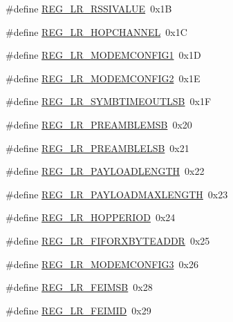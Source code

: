 \begin{DoxyCompactItemize}
\item 
\#define \mbox{\hyperlink{sx1276_regs-_lo_ra_8h_a51636b899dd268fa04ddfa2c66329f05}{R\+E\+G\+\_\+\+L\+R\+\_\+\+R\+S\+S\+I\+V\+A\+L\+UE}}~0x1B
\item 
\#define \mbox{\hyperlink{sx1276_regs-_lo_ra_8h_a5eb22acab75323e171815532117539e4}{R\+E\+G\+\_\+\+L\+R\+\_\+\+H\+O\+P\+C\+H\+A\+N\+N\+EL}}~0x1C
\item 
\#define \mbox{\hyperlink{sx1276_regs-_lo_ra_8h_af759d830088be4284079ba8aa75d98ae}{R\+E\+G\+\_\+\+L\+R\+\_\+\+M\+O\+D\+E\+M\+C\+O\+N\+F\+I\+G1}}~0x1D
\item 
\#define \mbox{\hyperlink{sx1276_regs-_lo_ra_8h_ae96f87f817a89b1240cfdc89f17b6e30}{R\+E\+G\+\_\+\+L\+R\+\_\+\+M\+O\+D\+E\+M\+C\+O\+N\+F\+I\+G2}}~0x1E
\item 
\#define \mbox{\hyperlink{sx1276_regs-_lo_ra_8h_a7759fc860cf446c7e1a92a823a89ea31}{R\+E\+G\+\_\+\+L\+R\+\_\+\+S\+Y\+M\+B\+T\+I\+M\+E\+O\+U\+T\+L\+SB}}~0x1F
\item 
\#define \mbox{\hyperlink{sx1276_regs-_lo_ra_8h_a786457a6b4788117f8a2b994e68344ba}{R\+E\+G\+\_\+\+L\+R\+\_\+\+P\+R\+E\+A\+M\+B\+L\+E\+M\+SB}}~0x20
\item 
\#define \mbox{\hyperlink{sx1276_regs-_lo_ra_8h_a4449a1e2b055269d13034ebb4ba705b2}{R\+E\+G\+\_\+\+L\+R\+\_\+\+P\+R\+E\+A\+M\+B\+L\+E\+L\+SB}}~0x21
\item 
\#define \mbox{\hyperlink{sx1276_regs-_lo_ra_8h_a702e1e9ac301d26eb08fed50b90c6718}{R\+E\+G\+\_\+\+L\+R\+\_\+\+P\+A\+Y\+L\+O\+A\+D\+L\+E\+N\+G\+TH}}~0x22
\item 
\#define \mbox{\hyperlink{sx1276_regs-_lo_ra_8h_ae71e7acfa7c8c737e55349e72c71349f}{R\+E\+G\+\_\+\+L\+R\+\_\+\+P\+A\+Y\+L\+O\+A\+D\+M\+A\+X\+L\+E\+N\+G\+TH}}~0x23
\item 
\#define \mbox{\hyperlink{sx1276_regs-_lo_ra_8h_a829b59cc8b18d86904af96d1dc60add2}{R\+E\+G\+\_\+\+L\+R\+\_\+\+H\+O\+P\+P\+E\+R\+I\+OD}}~0x24
\item 
\#define \mbox{\hyperlink{sx1276_regs-_lo_ra_8h_a71cd184cd1fae95aeb458d8361d51cdd}{R\+E\+G\+\_\+\+L\+R\+\_\+\+F\+I\+F\+O\+R\+X\+B\+Y\+T\+E\+A\+D\+DR}}~0x25
\item 
\#define \mbox{\hyperlink{sx1276_regs-_lo_ra_8h_aecf214e63c69601e543629269b0401c7}{R\+E\+G\+\_\+\+L\+R\+\_\+\+M\+O\+D\+E\+M\+C\+O\+N\+F\+I\+G3}}~0x26
\item 
\#define \mbox{\hyperlink{sx1276_regs-_lo_ra_8h_a71a7b80d5f8a8c64cd63ea8d81a33d26}{R\+E\+G\+\_\+\+L\+R\+\_\+\+F\+E\+I\+M\+SB}}~0x28
\item 
\#define \mbox{\hyperlink{sx1276_regs-_lo_ra_8h_a300ed0b1d23a5723176cfb26dcf2b32c}{R\+E\+G\+\_\+\+L\+R\+\_\+\+F\+E\+I\+M\+ID}}~0x29

\end{DoxyCompactItemize}
